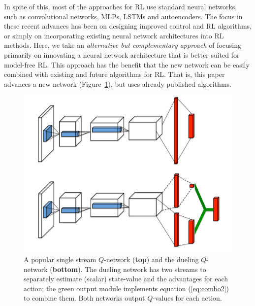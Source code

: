 In spite of this, most of the approaches for RL use standard neural networks, such as convolutional networks, MLPs, LSTMs and autoencoders. The focus in these recent advances has been on designing improved control and RL algorithms, or simply on incorporating existing neural network architectures into RL methods. Here, we take an \emph{alternative but complementary approach} of focusing primarily on innovating a neural network architecture that is better suited for model-free RL. This approach has the benefit that the new network can be easily combined with existing and future algorithms for RL. That is, this paper advances a new network (Figure~\ref{fig:duelnet}), but uses already published algorithms. 
\begin{figure}[b!]
\begin{center}
	\includegraphics[scale=0.3]{./figs/duelingNet}
\end{center}
\vspace{-5mm}
\caption{A popular single stream $Q$-network ({\bf top}) and the dueling $Q$-network ({\bf bottom}). The dueling network has two streams to separately estimate (scalar) state-value and the advantages for each action; the green output module implements equation (\ref{eq:combo2}) to combine them. Both networks output $Q$-values for each action.}
\label{fig:duelnet}
\end{figure}

